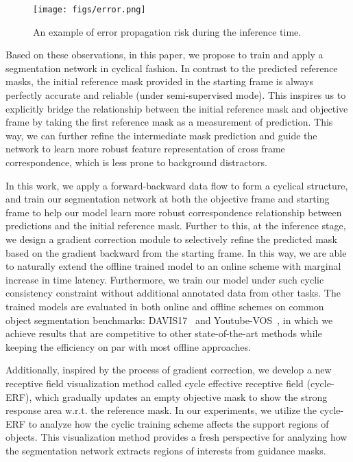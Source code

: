 \documentclass{article}
\begin{document}
\begin{figure}
    \centering
    \texttt{[image: figs/error.png]}
    \caption{An example of error propagation risk during the inference time.}
    \label{fig:error}
\end{figure}

 Based on these observations, in this paper, we propose to train and apply a segmentation network in cyclical fashion. In contrast to the predicted reference masks, the initial reference mask provided in the starting frame is always perfectly accurate and reliable (under semi-supervised mode). This inspires us to explicitly bridge the relationship between the initial reference mask and objective frame by taking the first reference mask as a measurement of prediction. This way, we can further refine the intermediate mask prediction and guide the network to learn more robust feature representation of cross frame correspondence, which is less prone to background distractors.
 
 In this work, we apply a forward-backward data flow to form a cyclical structure, and train our segmentation network at both the objective frame and starting frame to help our model learn more robust correspondence relationship between predictions and the initial reference mask. Further to this, at the inference stage, we design a gradient correction module to selectively refine the predicted mask based on the gradient backward from the starting frame. In this way, we are able to naturally extend the offline trained model to an online scheme with marginal increase in time latency. Furthermore, we train our model under such cyclic consistency constraint without additional annotated data from other tasks. The trained models are evaluated in both online and offline schemes on common object segmentation benchmarks: DAVIS17~\cite{Pont-Tuset_arXiv_2017} and Youtube-VOS~\cite{Xu_2018_S2S_ECCV}, in which we achieve results that are competitive to other state-of-the-art methods while keeping the efficiency on par with most offline approaches.
 
 Additionally, inspired by the process of gradient correction, we develop a new receptive field visualization method called cycle effective receptive field (cycle-ERF), which gradually updates an empty objective mask to show the strong response area w.r.t. the reference mask. In our experiments, we utilize the cycle-ERF to analyze how the cyclic training scheme affects the support regions of objects. This visualization method provides a fresh perspective for analyzing how the segmentation network extracts regions of interests from guidance masks.
 
\end{document}
